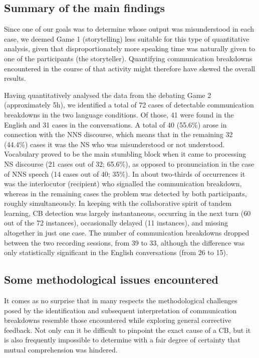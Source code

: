 \documentclass[output=paper,colorlinks,citecolor=brown,modfonts,nonflat]{../langscibook}
\begin{document}
\subsection{Summary of the main findings}\label{sec:scheuer:5.3}

Since one of our goals was to determine whose output was misunderstood in each case, we deemed Game 1 (storytelling) less suitable for this type of quantitative analysis, given that disproportionately more speaking time was naturally given to one of the participants (the storyteller). Quantifying communication breakdowns encountered in the course of that activity might therefore have skewed the overall results. 

Having quantitatively analysed the data from the debating Game 2 (approximately 5h), we identified a total of 72 cases of detectable communication breakdowns in the two language conditions. Of those, 41 were found in the English and 31 cases in the  conversations. A total of 40 (55.6\%) arose in connection with the NNS discourse, which means that in the remaining 32 (44.4\%) cases it was the NS who was misunderstood or not understood. Vocabulary proved to be the main stumbling block when it came to processing NS discourse (21 cases out of 32; 65.6\%), as opposed to pronunciation in the case of NNS speech (14 cases out of 40; 35\%). In about two-thirds of occurrences it was the interlocutor (recipient) who signalled the communication breakdown, whereas in the remaining cases the problem was detected by both participants, roughly simultaneously. In keeping with the collaborative spirit of tandem learning, CB detection was largely instantaneous, occurring in the next turn (60 out of the 72 instances), occasionally delayed (11 instances), and missing altogether in just one case. The number of communication breakdowns dropped between the two recording sessions, from 39 to 33, although the difference was only statistically significant in the English conversations (from 26 to 15).

\subsection{Some methodological issues encountered}\label{sec:scheuer:5.4}
It comes as no surprise that in many respects the methodological challenges posed by the identification and subsequent interpretation of communication breakdowns resemble those encountered while exploring general corrective feedback. Not only can it be difficult to pinpoint the exact cause of a CB, but it is also frequently impossible to determine with a fair degree of certainty that mutual comprehension was hindered. 
\end{document}
